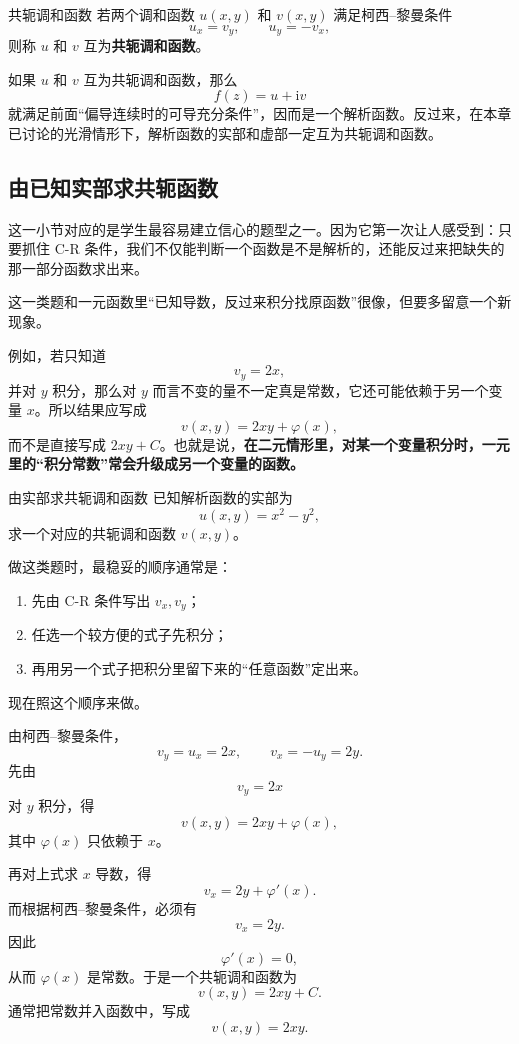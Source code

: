 \begin{dingliyi}{共轭调和函数}{}
若两个调和函数 $u(x,y)$ 和 $v(x,y)$ 满足柯西--黎曼条件
\[
    u_x=v_y,\qquad u_y=-v_x,
\]
则称 $u$ 和 $v$ 互为\textbf{共轭调和函数}。
\end{dingliyi}

\begin{zhu}{}{}
如果 $u$ 和 $v$ 互为共轭调和函数，那么
\[
    f(z)=u+\mathrm{i}v
\]
就满足前面``偏导连续时的可导充分条件''，因而是一个解析函数。反过来，在本章已讨论的光滑情形下，解析函数的实部和虚部一定互为共轭调和函数。
\end{zhu}

\subsection{由已知实部求共轭函数}

这一小节对应的是学生最容易建立信心的题型之一。因为它第一次让人感受到：只要抓住 C-R 条件，我们不仅能判断一个函数是不是解析的，还能反过来把缺失的那一部分函数求出来。

\begin{tishi}
这一类题和一元函数里``已知导数，反过来积分找原函数''很像，但要多留意一个新现象。

例如，若只知道
\[
    v_y=2x,
\]
并对 $y$ 积分，那么对 $y$ 而言不变的量不一定真是常数，它还可能依赖于另一个变量 $x$。所以结果应写成
\[
    v(x,y)=2xy+\varphi(x),
\]
而不是直接写成 $2xy+C$。也就是说，\textbf{在二元情形里，对某一个变量积分时，一元里的``积分常数''常会升级成另一个变量的函数。}
\end{tishi}

\begin{lizi}{由实部求共轭调和函数}{}
已知解析函数的实部为
\[
    u(x,y)=x^2-y^2,
\]
求一个对应的共轭调和函数 $v(x,y)$。

\begin{jie}
做这类题时，最稳妥的顺序通常是：
\begin{enumerate}
    \item 先由 C-R 条件写出 $v_x,v_y$；
    \item 任选一个较方便的式子先积分；
    \item 再用另一个式子把积分里留下来的``任意函数''定出来。
\end{enumerate}

现在照这个顺序来做。

由柯西--黎曼条件，
\[
    v_y=u_x=2x,\qquad v_x=-u_y=2y.
\]
先由
\[
    v_y=2x
\]
对 $y$ 积分，得
\[
    v(x,y)=2xy+\varphi(x),
\]
其中 $\varphi(x)$ 只依赖于 $x$。

再对上式求 $x$ 导数，得
\[
    v_x=2y+\varphi'(x).
\]
而根据柯西--黎曼条件，必须有
\[
    v_x=2y.
\]
因此
\[
    \varphi'(x)=0,
\]
从而 $\varphi(x)$ 是常数。于是一个共轭调和函数为
\[
    v(x,y)=2xy+C.
\]
通常把常数并入函数中，写成
\[
    v(x,y)=2xy.
\]
\end{jie}
\end{lizi}

